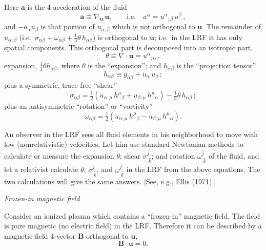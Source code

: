 \noindent
Here $\mathbf{a}$ is the 4-acceleration of the fluid
%
\begin{equation}
\tag{2.5.18a}
\mathbf{a} \equiv \nabla_{\mathbf{u}}\,\mathbf{u},
\qquad\text{i.e.}\quad
a^\alpha = u^\alpha{}_{;\beta}\, u^\beta\,,
\end{equation}
%
and $-a_\alpha u_\beta$ is that portion of $u_{\alpha;\beta}$ which is
not orthogonal to $\mathbf{u}$.  The remainder of $u_{\alpha;\beta}$
(i.e.\ $\sigma_{\alpha\beta} + \omega_{\alpha\beta} +
\tfrac{1}{3}\theta\, h_{\alpha\beta}$) is orthogonal to $\mathbf{u}$;
i.e.\ in the LRF it has only spatial components.  This orthogonal part
is decomposed into an isotropic part,
%
\begin{equation}
\tag{2.5.18b}
\theta \equiv \nabla \cdot \mathbf{u}
= u^\alpha{}_{;\alpha}\,,
\end{equation}
%
expansion, $\tfrac{1}{3}\theta h_{\alpha\beta}$, where $\theta$ is the
``expansion''; and $h_{\alpha\beta}$ is the ``projection tensor''
%
\begin{equation}
\tag{2.5.18c}
h_{\alpha\beta} \equiv g_{\alpha\beta} + u_\alpha\, u_\beta\,;
\end{equation}
%
plus a symmetric, trace-free ``shear''
%
\begin{equation}
\tag{2.5.18d}
\sigma_{\alpha\beta}
= \tfrac{1}{2}(u_{\alpha;\mu}\, h^\mu{}_\beta
              + u_{\beta;\mu}\, h^\mu{}_\alpha)
  - \tfrac{1}{3}\theta\, h_{\alpha\beta}\,;
\end{equation}
%
plus an antisymmetric ``rotation'' or ``vorticity''
%
\begin{equation}
\tag{2.5.18e}
\omega_{\alpha\beta}
= \tfrac{1}{2}(u_{\alpha;\mu}\, h^\mu{}_\beta
              - u_{\beta;\mu}\, h^\mu{}_\alpha).
\end{equation}

An observer in the LRF sees all fluid elements in his neighborhood to
move with low (nonrelativistic) velocities.  Let him use standard
Newtonian methods to calculate or measure the expansion $\theta$; shear
$\sigma^{\hat{j}}_{\;\hat{k}}$; and rotation $\omega^{\hat{j}}_{\;\hat{k}}$
of the fluid, and let a relativist calculate $\theta$,
$\sigma^{\hat{j}}_{\;\hat{k}}$, and
$\omega^{\hat{j}}_{\;\hat{k}}$ in the LRF from the above equations.
The two calculations will give the same answers.
[See, e.g., Ellis (1971).]

\bigskip
\noindent
\emph{Frozen-in magnetic field}

\smallskip
\noindent
Consider an ionized plasma which contains a ``frozen-in'' magnetic field.
The field is pure magnetic (no electric field) in the LRF.  Therefore
it can be described by a magnetic-field 4-vector $\mathbf{B}$
orthogonal to $\mathbf{u}$,
%
\begin{equation}
\tag{2.5.19}
\mathbf{B}\cdot\mathbf{u} = 0.
\end{equation}

